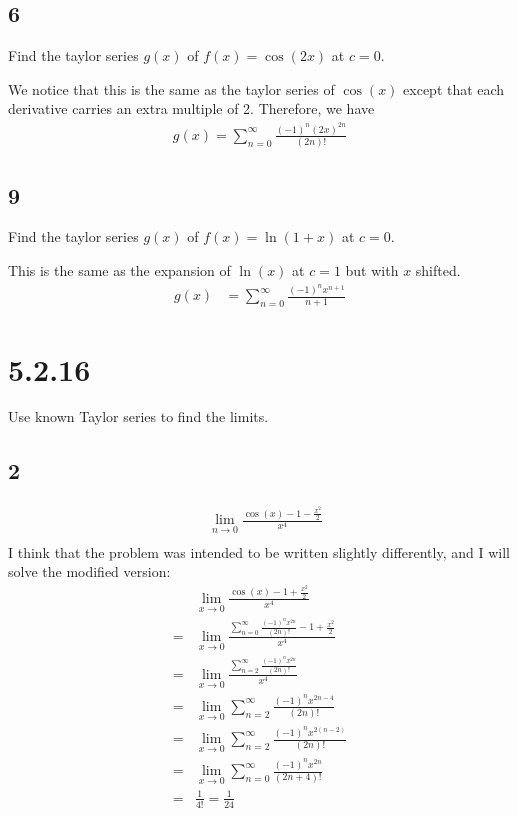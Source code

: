\documentclass[12pt]{article}
\begin{document}
\subsection*{6}
Find the taylor series $g(x)$ of $f(x) = \cos(2x)$ at $c=0$.

We notice that this is the same as the taylor series of $\cos(x)$ except that each derivative carries an extra multiple of 2. Therefore, we have
\begin{align*}
    g(x) = \sum_{n=0}^\infty \frac{(-1)^n (2x)^{2n}}{(2n)!}
\end{align*}

\subsection*{9}
Find the taylor series $g(x)$ of $f(x) = \ln(1+x)$ at $c=0$.

This is the same as the expansion of $\ln(x)$ at $c=1$ but with $x$ shifted.
\begin{align*}
    g(x) &= \sum_{n=0}^\infty \frac{(-1)^n x^{n+1}}{n+1}
\end{align*}



\section*{5.2.16}
Use known Taylor series to find the limits.

\subsection*{2}
\begin{align*}
     & \lim_{n\to0} \frac{\cos(x) - 1 - \frac{x^2}{2}}{x^4} \\
\end{align*}
I think that the problem was intended to be written slightly differently, and I will solve the modified version:
\begin{align*}
     & \lim_{x\to0} \frac{\cos(x) - 1 + \frac{x^2}{2}}{x^4} \\
    =& \lim_{x\to0} \frac{\sum_{n=0}^\infty \frac{(-1)^n x^{2n}}{(2n)!} - 1 + \frac{x^2}{2}}{x^4} \\
    =& \lim_{x\to0} \frac{\sum_{n=2}^\infty \frac{(-1)^n x^{2n}}{(2n)!}}{x^4} \\
    =& \lim_{x\to0} \sum_{n=2}^\infty \frac{(-1)^n x^{2n-4}}{(2n)!} \\
    =& \lim_{x\to0} \sum_{n=2}^\infty \frac{(-1)^n x^{2(n-2)}}{(2n)!} \\
    =& \lim_{x\to0} \sum_{n=0}^\infty \frac{(-1)^n x^{2n}}{(2n+4)!} \\
    =& \frac{1}{4!} = \frac{1}{24}
\end{align*}
\end{document}
